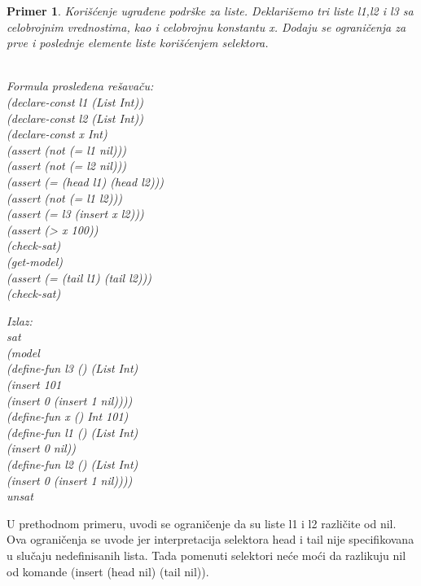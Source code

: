 \documentclass[12pt,oneside]{memoir}
\newtheorem{primer}{Primer}
\begin{document}
\begin{primer} Korišćenje ugrađene podrške za liste. Deklarišemo tri liste l1,l2 i l3 sa celobrojnim vrednostima, kao i celobrojnu konstantu x. Dodaju se ograničenja za prve i poslednje elemente liste korišćenjem selektora. 
\\ \\
\begin{minipage}[b]{0.5\textwidth}
Formula prosleđena rešavaču:
\\(declare-const l1 (List Int))
\\(declare-const l2 (List Int))
\\(declare-const x Int)
\\(assert (not (= l1 nil)))
\\(assert (not (= l2 nil)))
\\(assert (= (head l1) (head l2)))
\\(assert (not (= l1 l2)))
\\(assert (= l3 (insert x l2)))
\\(assert (> x 100))
\\(check-sat)
\\(get-model)
\\(assert (= (tail l1) (tail l2)))
\\(check-sat)
\end{minipage}
\hspace{2.2cm}
\begin{minipage}[t]{0.5\textwidth}
\vspace{-8.45cm}
Izlaz:
\\sat 
\\(model 
\\(define-fun l3 () (List Int) 
\\(insert 101 
\\(insert 0 (insert 1 nil)))) 
\\(define-fun x () Int 101) 
\\(define-fun l1 () (List Int) 
\\(insert 0 nil)) 
\\(define-fun l2 () (List Int) 
\\(insert 0 (insert 1 nil)))) 
\\unsat
\end{minipage}


\end{primer}

U prethodnom primeru, uvodi se ograničenje da su liste l1 i l2 različite od nil. Ova ograničenja se uvode jer interpretacija selektora head i tail 
nije specifikovana u slučaju nedefinisanih lista.
Tada pomenuti selektori neće moći da razlikuju nil od komande (insert (head nil) (tail nil)).
\end{document}

